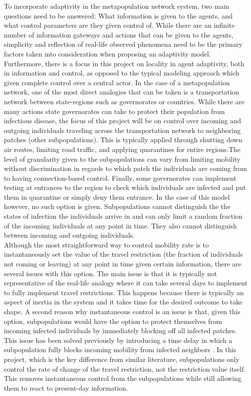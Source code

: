 To incorporate adaptivity in the metapopulation network system, two main questions need to be answered: What information is given to the agents, and what control parameters are they given control of. While there are an infinite number of information gateways and actions that can be given to the agents, simplicity and reflection of real-life observed phenomena need to be the primary factors taken into consideration when proposing an adaptivity model. Furthermore, there is a focus in this project on locality in agent adaptivity, both in information and control, as opposed to the typical modeling approach which given complete control over a central actor. In the case of a metapopulation network, one of the most direct analogies that can be taken is a transportation network between state-regions such as governorates or countries. While there are many actions state governorates can take to protect their population from infectious disease, the focus of this project will be on control over incoming and outgoing individuals traveling across the transportation network to neighboring patches (other subpopulations). This is typically applied through shutting down air routes, limiting road traffic, and applying quarantines for entire regions.The level of granularity given to the subpopulations can vary from limiting mobility without discrimination in regards to which patch the individuals are coming from to having connection-based control. Finally, some governorates can implement testing at entrances to the region to check which individuals are infected and put them in quarantine or simply deny them entrance. In the case of this model however, no such option is given. Subpopulations cannot distinguish the the states of infection the individuals arrive in and can only limit a random fraction of the incoming individuals at any point in time. They also cannot distinguish between incoming and outgoing individuals.\\

Although the most straightforward way to control mobility rate is to instantaneously set the value of the travel restriction (the fraction of individuals not coming or leaving) at any point in time given certain information, there are several issues with this option. The main issue is that it is typically not representative of the real-life analogy where it can take several days to implement to fully implement travel restrictions. This happens because there is typically an aspect of inertia in the system and it takes time for the desired outcome to take shape. A second reason why instantaneous control is an issue is that, given this option, subpopulations would have the option to protect themselves from incoming infected individuals by immediately blocking off all infected patches. This issue has been solved previously by introducing a time delay in which a subpopulation fully blocks incoming mobility from infected neighbors \cite{feng2020infectious}. In this project, which is the key difference from similar literature, subpopulations only control the rate of change of the travel restriction, not the restriction value itself. This removes instantaneous control from the subpopulations while still allowing them to react to present-day information.\\

